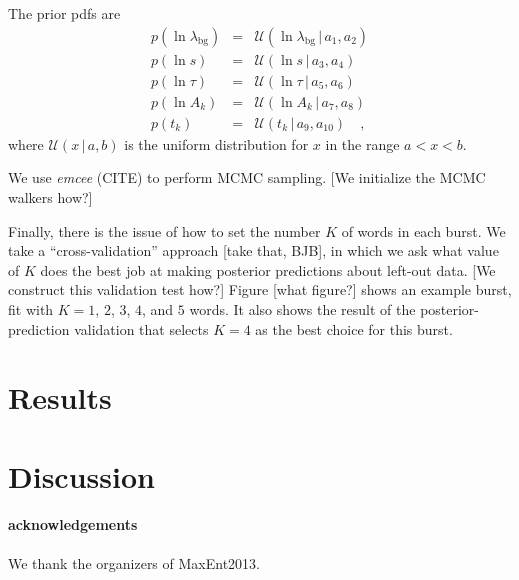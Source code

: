 \documentclass[12pt]{article}
\newcommand{\project}[1]{\textsl{#1}}
\newcommand{\given}{\,|\,}
\newcommand{\Uniform}{{\mathcal U}}
\newcommand{\bg}{\mathrm{bg}}
\begin{document}
The prior pdfs are
\begin{eqnarray}
p(\ln\lambda_{\bg}) &=& \Uniform(\ln\lambda_{\bg}\given a_1, a_2)
\\
p(\ln s) &=& \Uniform(\ln s\given a_3, a_4)
\\
p(\ln\tau) &=& \Uniform(\ln\tau\given a_5, a_6)
\\
p(\ln A_k) &=& \Uniform(\ln A_k\given a_7, a_8)
\\
p(t_k) &=& \Uniform(t_k\given a_9, a_{10})
\quad,
\end{eqnarray}
where $\Uniform(x\given a, b)$ is the uniform distribution for $x$ in the range $a<x<b$.

We use \project{emcee} (CITE) to perform MCMC sampling.
[We initialize the MCMC walkers how?]

Finally, there is the issue of how to set the number $K$ of words in each burst.
We take a ``cross-validation'' approach [take that, BJB],
  in which we ask what value of $K$ does the best job at making posterior predictions
  about left-out data.
[We construct this validation test how?]
Figure [what figure?] shows an example burst,
  fit with $K=1$, $2$, $3$, $4$, and $5$ words.
It also shows the result of the posterior-prediction validation
  that selects $K=4$ as the best choice for this burst.

\section{Results}

\section{Discussion}


\paragraph{acknowledgements}
We thank the organizers of MaxEnt2013.
\end{document}
